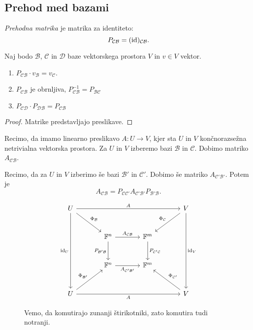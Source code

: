 \documentclass[12pt, a4paper]{article}
\begin{document}
\newpage

\subsection{Prehod med bazami}

\begin{definicija}
\emph{Prehodna matrika} je matrika za identiteto:
\[
P_{\mathcal{CB}}=(\operatorname{id})_{\mathcal{CB}}.
\]
\end{definicija}

\begin{trditev}
Naj bodo $\mathcal{B}$, $\mathcal{C}$ in $\mathcal{D}$ baze vektorskega prostora $V$ in $v\in V$ vektor.

\begin{enumerate}[label=\roman*)]
\item $P_{\mathcal{CB}}\cdot v_{\mathcal{B}}=v_{\mathcal{C}}$.
\item $P_{\mathcal{CB}}$ je obrnljiva, $P_{\mathcal{CB}}^{-1}=P_{\mathcal{BC}}$
\item $P_{\mathcal{CD}}\cdot P_{\mathcal{DB}}=P_{\mathcal{CB}}$
\end{enumerate}
\end{trditev}

\begin{proof}
Matrike predstavljajo preslikave.
\end{proof}

Recimo, da imamo linearno preslikavo $A\colon U\to V$, kjer sta $U$ in $V$ končnorazsežna netrivialna vektorska prostora. Za $U$ in $V$ izberemo bazi $\mathcal{B}$ in $\mathcal{C}$. Dobimo matriko $A_{\mathcal{CB}}$.

Recimo, da za $U$ in $V$ izberimo še bazi $\mathcal{B'}$ in $\mathcal{C'}$. Dobimo še matriko $A_{\mathcal{C'B'}}$. Potem je
\[
A_{\mathcal{CB}}=P_{\mathcal{CC'}}A_{\mathcal{C'B'}}P_{\mathcal{B'B}}.
\]

\begin{figure}[H]
\[
\begin{tikzcd}[column sep=large, row sep=large]
U \arrow[rrr, "A"] \arrow[ddd, "\id_U"'] \arrow[dr, "\Phi_{\mathcal{B}}"] &
&
&
V \arrow[ddd, "\id_V"] \arrow[dl, "\Phi_{\mathcal{C}}"']
\\
&
\F^n \arrow[r, "A_{\mathcal{CB}}"] \arrow[d, "P_\mathcal{B'B}"']
&
\F^m \arrow[d, "P_\mathcal{C'C}"]
\\
&
\F^n \arrow[r, "A_{\mathcal{C'B'}}"']
&
\F^m
\\
U \arrow[rrr, "A"'] \arrow[ur, "\Phi_{\mathcal{B'}}"]
&
&
&
V \arrow[ul, "\Phi_{\mathcal{C'}}"']
\end{tikzcd}
\]
\caption{Vemo, da komutirajo zunanji štirikotniki, zato komutira tudi notranji.}
\end{figure}
\end{document}
